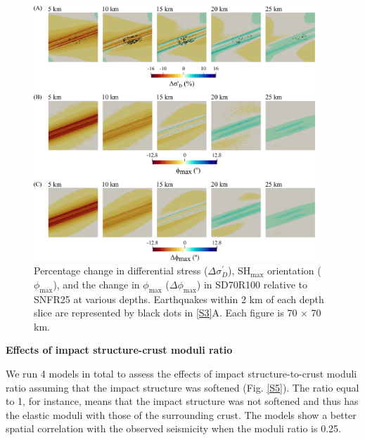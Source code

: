 \documentclass[draft,jgrga]{agutexSI2019}
\begin{document}
\begin{article}
\vspace{10mm} %

\begin{figure}[ht]
\includegraphics[width=25pc]{Figures/SD70R100_S1.png}
\caption{Percentage change in differential stress ($\Delta\sigma_{D}^{\prime}$), SH$_{\max}$ orientation ($\phi_{\max}$), and the change in $\phi_{\max}$ ($\Delta\phi_{\max}$) in SD70R100 relative to SNFR25 at various depths. Earthquakes within 2 km of each depth slice are represented by black dots in \ref{S3}A. Each figure is 70 $\times$ 70 km.}
\label{S4}
\end{figure}

\vspace{10mm} %

\noindent\textbf{Effects of impact structure-crust moduli ratio}

We run 4 models in total to assess the effects of impact structure-to-crust moduli ratio assuming that the impact structure was softened (Fig. \ref{S5}). The ratio equal to 1, for instance, means that the impact structure was not softened and thus has the elastic moduli with those of the surrounding crust. The models show a better spatial correlation with the observed seismicity when the moduli ratio is 0.25. 

\vspace{10mm} %


\end{article}
\end{document}
